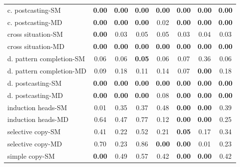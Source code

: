 \documentclass{article}
\begin{document}
\begin{table}[H]
{\begin{tabular}{lccccccc}
    c. postcasting-SM         & \textbf{0.00}  & \textbf{0.00}  & \textbf{0.00}  & \textbf{0.00}  & \textbf{0.00}               & \textbf{0.00}              & \textbf{0.00}  \\
    c. postcasting-MD         & \textbf{0.00}  & \textbf{0.00}  & \textbf{0.00}  & 0.02      & \textbf{0.00}               & \textbf{0.00}              & \textbf{0.00}  \\
    cross situation-SM                & \textbf{0.00}  & 0.03      & 0.05      & 0.05      & 0.03                   & 0.04                  & 0.03      \\
    cross situation-MD                & \textbf{0.00}  & \textbf{0.00}  & \textbf{0.00}  & \textbf{0.00}  & \textbf{0.00}               & \textbf{0.00}              & \textbf{0.00}  \\
    d. pattern completion-SM    & 0.06      & 0.06      & \textbf{0.05}  & 0.06      & 0.07                   & 0.36                  & 0.06      \\
    d. pattern completion-MD    & 0.09      & 0.18      & 0.11      & 0.14      & 0.07                   & \textbf{0.00}              & 0.18      \\
    d. postcasting-SM           & \textbf{0.00}  & \textbf{0.00}  & \textbf{0.00}  & \textbf{0.00}  & \textbf{0.00}               & \textbf{0.00}              & \textbf{0.00}  \\
    d. postcasting-MD           & \textbf{0.00}  & \textbf{0.00}  & \textbf{0.00}  & 0.08      & \textbf{0.00}               & \textbf{0.00}              & \textbf{0.00}  \\
    induction heads-SM                & 0.01      & 0.35      & 0.37      & 0.48      & \textbf{0.00}               & \textbf{0.00}              & 0.39      \\
    induction heads-MD                & 0.64      & 0.47      & 0.77      & 0.12      & \textbf{0.00}               & \textbf{0.00}              & 0.25      \\
    selective copy-SM                 & 0.41      & 0.22      & 0.52      & 0.21      & \textbf{0.05}               & 0.17                  & 0.34      \\
    selective copy-MD                 & 0.70      & 0.23      & 0.86      & \textbf{0.00}  & \textbf{0.00}               & 0.01                  & 0.23      \\
    simple copy-SM                    & \textbf{0.00}  & 0.49      & 0.57      & 0.42      & \textbf{0.00}               & \textbf{0.00}              & 0.42      \\

\end{tabular}}
\end{table}
\end{document}

